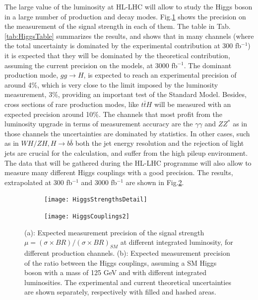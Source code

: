 \documentclass[a4paper,twoside,12pt]{book}
\begin{document}
The large value of the luminosity at HL-LHC will allow to study the Higgs boson in a large number of
production and decay modes. Fig.\ref{fig:HiggsStrengths} shows the precision on the measurement
of the signal strength in each of them. The table in Tab.\ref{tab:HiggsTable} summarizes
the results, and shows that in many channels (where the total uncertainty is
dominated by the experimental contribution at 300 fb$^{-1}$) it is expected that 
they will be dominated by
the theoretical contribution, assuming the current precision on
the models, at 3000 fb$^{-1}$. The dominant production mode, $gg \rightarrow H$, is expected to reach
an experimental precision of around 4\%, which is very close to the limit imposed by the luminosity 
measurement, 3\%, providing an important test of the Standard Model. Besides, cross
sections of rare production modes, like $t\bar{t}H$ will be
measured with an expected precision around 10\%. The channels that most profit from the
luminosity upgrade in terms of measurement accuracy are the $\gamma\gamma$ and $ZZ^*$
as in those channels the uncertainties are dominated by statistics. In other cases, such as in $WH/ZH, H \rightarrow b\bar{b}$ both the jet
energy resolution and the rejection of light jets are crucial for the calculation, and suffer from
the high pileup environment. \\

The data that will be gathered during the HL-LHC programme will also allow to
measure many different Higgs couplings with a good precision. The results, extrapolated
at 300 fb$^{-1}$ and 3000 fb$^{-1}$ are shown in Fig.\ref{fig:higgsCouplings}.\\



\begin{figure} [h]
\begin{subfigure}{.5\linewidth}
	\centering
	\texttt{[image: HiggsStrengthsDetail]}
	\caption{}
	\label{fig:HiggsStrengths}
\end{subfigure}
\begin{subfigure}{.5\linewidth}
	\centering
	\texttt{[image: HiggsCouplings2]}
	\caption{}
	\label{fig:higgsCouplings}
\end{subfigure}
\caption{(a): Expected measurement precision of the signal strength $\mu = (\sigma \times BR)/(\sigma \times BR)_{SM}$\cite{loi} at different integrated luminosity, for different
	production channels. (b): Expected measurement precision of the ratio between the
	Higgs couplings, assuming a SM Higgs boson with a mass of 125 GeV and with different integrated luminosities.
	 The experimental and current theoretical uncertainties are shown separately, respectively with filled and hashed areas\cite{higgsNote}.}
\label{fig:higgsMeasurement}
\end{figure}
\end{document}
